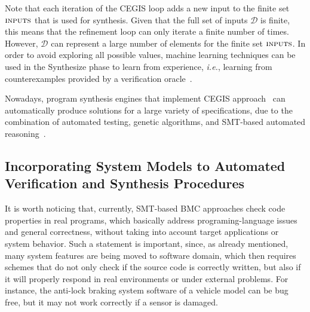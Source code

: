 \documentclass{acm_sen_article}
\begin{document}
Note that each iteration of the CEGIS loop adds a new input to the finite set $\text{\sc inputs}$ that is used for synthesis.  Given that the full set of inputs $\mathcal{D}$ is finite, this means that the refinement loop can only iterate a finite number of times. However, $\mathcal{D}$ can represent a large number of elements for the finite set $\text{\sc inputs}$. In order to avoid exploring all possible values, machine learning techniques can be used in the {\sc Synthesize} phase to learn from experience, {\it i.e.}, learning from counterexamples provided by a verification oracle~\cite{Alur13}.

Nowadays, program synthesis engines that implement CEGIS approach~\cite{sketch} can automatically produce solutions for a large variety of specifications, due to the combination of automated testing, genetic algorithms, and SMT-based automated reasoning~\cite{Sharma14}.

\subsection{Incorporating System Models to Automated \\ Verification and Synthesis Procedures}

It is worth noticing that, currently, SMT-based BMC approaches check code properties in real programs, which basically address programing-language issues and general correctness, without taking into account target applications or system behavior. Such a statement is important, since, as already mentioned, many system features are being moved to software domain, which then requires schemes that do not only check if the source code is correctly written, but also if it will properly respond in real environments or under external problems. For instance, the anti-lock braking system software of a vehicle model can be bug free, but it may not work correctly if a sensor is damaged.
\end{document}
